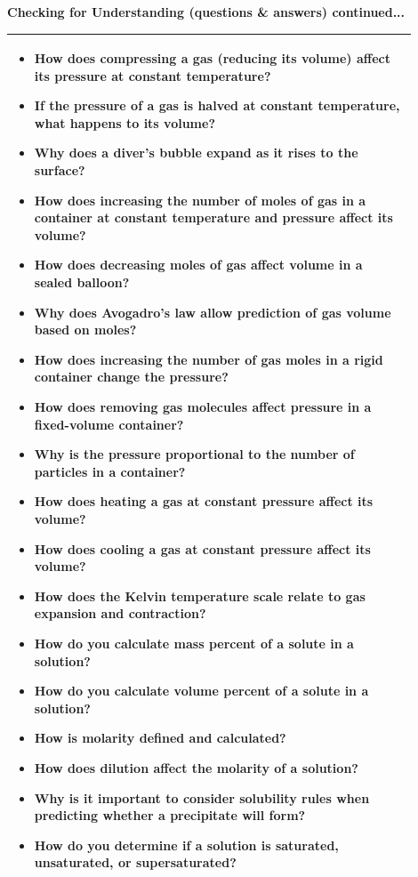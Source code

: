 \documentclass{article}
\begin{document}
{\newpage
\noindent
{\large\textbf{Checking for Understanding (questions \& answers) continued...} \\
\vspace{0.2cm}
\begin{tabular}{|p{0.9\linewidth}|}
\hline
\begin{itemize}
\item How does compressing a gas (reducing its volume) affect its pressure at constant temperature?
\item If the pressure of a gas is halved at constant temperature, what happens to its volume?
\item Why does a diver’s bubble expand as it rises to the surface?
\item How does increasing the number of moles of gas in a container at constant temperature and pressure affect its volume?
\item How does decreasing moles of gas affect volume in a sealed balloon?
\item Why does Avogadro’s law allow prediction of gas volume based on moles?
\item How does increasing the number of gas moles in a rigid container change the pressure?
\item How does removing gas molecules affect pressure in a fixed-volume container?
\item Why is the pressure proportional to the number of particles in a container?
\item How does heating a gas at constant pressure affect its volume?
\item How does cooling a gas at constant pressure affect its volume?
\item How does the Kelvin temperature scale relate to gas expansion and contraction?
\item How do you calculate mass percent of a solute in a solution?
\item How do you calculate volume percent of a solute in a solution?
\item How is molarity defined and calculated?
\item How does dilution affect the molarity of a solution?
\item Why is it important to consider solubility rules when predicting whether a precipitate will form?
\item How do you determine if a solution is saturated, unsaturated, or supersaturated?
\end{itemize} \\
\hline
\end{tabular}
\newpage

}}
\end{document}
